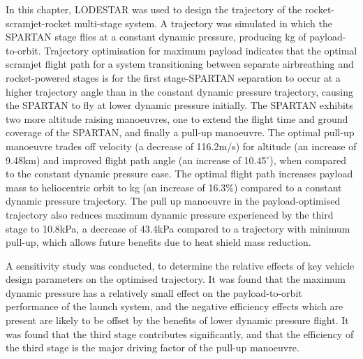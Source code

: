 In this chapter, LODESTAR was used to design the trajectory of the rocket-scramjet-rocket multi-stage system. 
A trajectory was simulated in which the SPARTAN stage flies at a constant dynamic pressure, producing \PayloadToOrbitConstq kg of payload-to-orbit. Trajectory optimisation for maximum payload indicates that the optimal scramjet flight path for a system transitioning between separate airbreathing and rocket-powered stages is for the first stage-SPARTAN separation to occur at a higher trajectory angle than in the constant dynamic pressure trajectory, causing the SPARTAN to fly at lower dynamic pressure initially. The SPARTAN exhibits two more altitude raising manoeuvres, one to extend the flight time and ground coverage of the SPARTAN, and finally a pull-up manoeuvre. The optimal pull-up manoeuvre trades off velocity (a decrease of 116.2m/s) for altitude (an increase of 9.48km) and improved flight path angle (an increase of 10.45$^\circ$), when compared to the constant dynamic pressure case. The optimal flight path increases payload mass to heliocentric orbit to \PayloadToOrbitStandard kg (an increase of 16.3\%) compared to a constant dynamic pressure trajectory. The pull up manoeuvre in the payload-optimised trajectory also reduces maximum dynamic pressure experienced by the third stage to 10.8kPa, a decrease of 43.4kPa compared to a trajectory with minimum pull-up, which allows future benefits due to heat shield mass reduction.  

A sensitivity study was conducted, to determine the relative effects of key vehicle design parameters on the optimised trajectory. It was found that the maximum dynamic pressure has a relatively small effect on the payload-to-orbit performance of the launch system, and the negative efficiency effects which are present are likely to be offset by the benefits of lower dynamic pressure flight. 
It was found that the third stage contributes significantly, and that the efficiency of the third stage is the major driving factor of the pull-up manoeuvre. 
